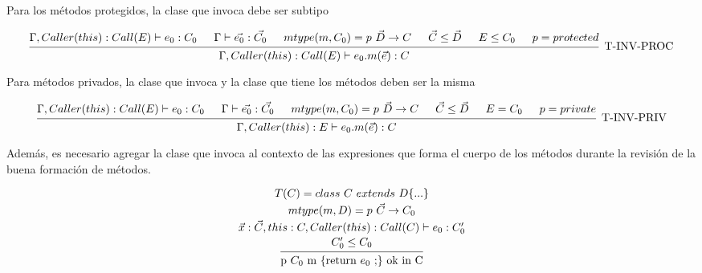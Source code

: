 \documentclass{article}
\begin{document}
\begin{enumerate}
        Para los métodos protegidos, la clase que invoca debe ser subtipo

        \[\begin{prooftree}
            \hypo{\Gamma, Caller(this) : Call(E) \vdash e_0 : C_0}
            \hypo{\Gamma \vdash \vec{e_0} : \vec{C_0}}
            \hypo{mtype(m, C_0) = p \ \vec{D} \rightarrow C}
            \hypo{\vec{C} \leq \vec{D}}
            \hypo{E \leq C_0}
            \hypo{p = protected}
            \infer 6 [T-INV-PROC] {\Gamma, Caller(this) : Call(E) \vdash e_0.m(\vec{e}) : C}
        \end{prooftree}\]

        Para métodos privados, la clase que invoca y la clase que tiene los
        métodos deben ser la misma

        \[\begin{prooftree}
            \hypo{\Gamma, Caller(this) : Call(E) \vdash e_0 : C_0}
            \hypo{\Gamma \vdash \vec{e_0} : \vec{C_0}}
            \hypo{mtype(m, C_0) = p \ \vec{D} \rightarrow C}
            \hypo{\vec{C} \leq \vec{D}}
            \hypo{E = C_0}
            \hypo{p = private}
            \infer 6 [T-INV-PRIV] {\Gamma, Caller(this) : E \vdash e_0.m(\vec{e}) : C}
        \end{prooftree}\]

        Además, es necesario agregar la clase que invoca al contexto de las
        expresiones que forma el cuerpo de los métodos durante la revisión de la
        buena formación de métodos.

        \[\begin{prooftree}
            \hypo{T(C) = class \ C \ extends \ D\{...\}}
            \infer [no rule] 1 {mtype(m, D) = p \ \vec{C} \rightarrow C_0}
            \infer [no rule] 1 {\vec{x}:\vec{C}, this:C, Caller(this) : Call(C) \vdash e_0 : C_0'}
            \infer [no rule] 1 {C_0' \leq C_0}
            \infer 1 {$p $C_0$ m \{return $e_0$ ;\} ok in C$}
        \end{prooftree}\]


    \end{enumerate}
\end{document}
